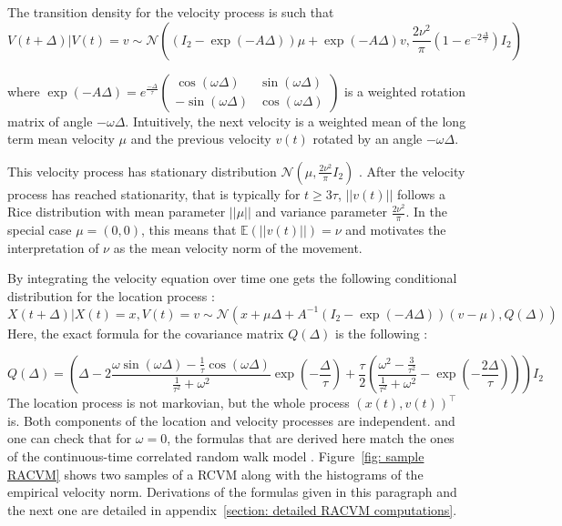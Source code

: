 \documentclass[11pt]{article}
\newcommand {\E}{\mathbb{E}}
\newcommand {\1}{\mathbb{1}}
\begin{document}
The transition density for the velocity process is such that 
\begin{equation}V(t+\Delta) \vert V(t)=v \sim \mathcal{N}\left( (I_2-\exp(-A\Delta))\mu + \exp(-A\Delta)v, \frac{2\nu^2}{\pi}(1-e^{-2\frac{\Delta}{\tau}}) I_2 \right) 
\end{equation}


where $\exp(-A\Delta)=e^{\frac{-\Delta}{\tau}} \begin{pmatrix} \cos(\omega \Delta) & \sin(\omega \Delta) \\ -\sin(\omega \Delta) & \cos(\omega \Delta) \end{pmatrix}$ is a weighted rotation matrix of angle $-\omega \Delta$.
Intuitively, the next velocity is a weighted mean of the long term mean velocity $\mu$ and the previous velocity $v(t)$ rotated by an angle $-\omega \Delta$.


This velocity process has stationary distribution $\mathcal{N}\left(\mu,\frac{2\nu^2}{\pi} I_2\right)$ \cite{gurarie_correlated_2017}. After the velocity process has reached stationarity, that is typically for $t \geq 3\tau$, $\vert \vert v(t) \vert \vert$ follows a Rice distribution with mean parameter $\vert \vert \mu \vert \vert$ and variance parameter $\frac{2\nu^2}{\pi}$. In the special case $\mu=(0,0)$, this means that $\E(\vert \vert v(t) \vert \vert)=\nu$ and motivates the interpretation of $\nu$ as the mean velocity norm of the movement.

By integrating the velocity equation over time one gets the following conditional distribution for the location process :
\begin{equation}
	X(t+\Delta) \vert X(t)=x, V(t)=v \sim \mathcal{N}\left(x+\mu \Delta+A^{-1} \left( I_2-\exp(-A\Delta)\right)(v-\mu),Q(\Delta)\right)  
\end{equation}
Here, the exact formula for the covariance matrix $Q(\Delta)$ is the following :

\[
Q(\Delta)=\left( \Delta-2 \frac{\omega \sin(\omega \Delta)-\frac{1}{\tau} \cos(\omega \Delta)}{\frac{1}{\tau^2}+\omega^2 } \exp\left( -\frac{\Delta}{\tau} \right) +\frac{\tau}{2} \left( \frac{\omega^2-\frac{3}{\tau^2}}{\frac{1}{\tau^2}+\omega^2}-\exp\left( -\frac{2\Delta}{\tau}\right)\right) \right) I_2
\]
The location process is not markovian, but the whole process $(x(t), v(t))^\top$ is.
Both components of the location and velocity processes are independent.
and one can check that for $\omega=0$, the formulas that are derived here match the ones of the continuous-time correlated random walk model \cite{johnson_continuoustime_2008}. Figure~\ref{fig: sample RACVM} shows two samples of a RCVM along with the histograms of the empirical velocity norm. Derivations of the formulas given in this paragraph and the next one are detailed in appendix~\ref{section: detailed RACVM computations}.\\
\end{document}
